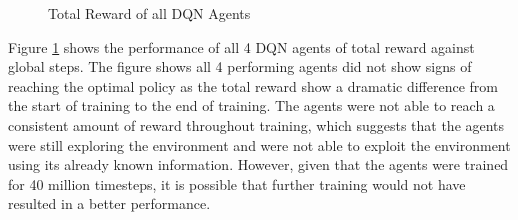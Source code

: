 \begin{figure}[H]
    \centering
    \caption{Total Reward of all DQN Agents}
    \label{fig:DQN_total_reward}
\end{figure}

Figure \ref{fig:DQN_total_reward} shows the performance of all 4 DQN agents of total reward against global steps. The figure shows all 4 performing agents did not show signs of reaching the optimal policy as the total reward show a dramatic difference from the start of training to the end of training. The agents were not able to reach a consistent amount of reward throughout training, which suggests that the agents were still exploring the environment and were not able to exploit the environment using its already known information. However, given that the agents were trained for 40 million timesteps, it is possible that further training would not have resulted in a better performance.

